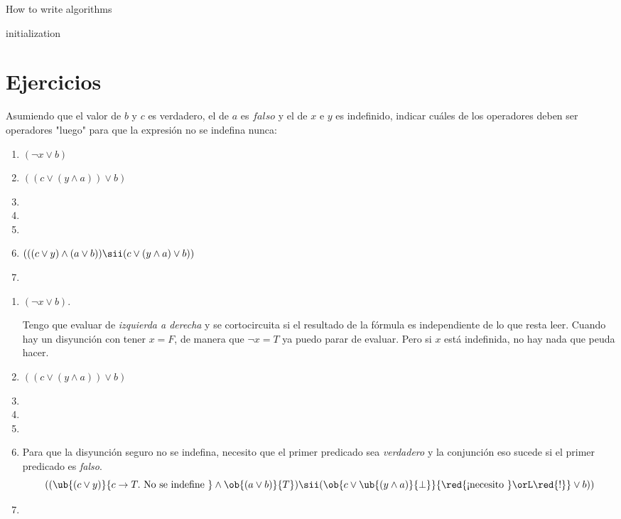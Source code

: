 



\begin{algorithm}[H] \caption{
    How to write algorithms
  }

  \BlankLine
  initialization\;
\end{algorithm}

\section*{Ejercicios}

\begin{enunciado}{\ejercicio}
  Asumiendo que el valor de $b$ y $c$ es verdadero, el de $a$ es $falso$ y el de $x$ e $y$ es indefinido, indicar cuáles de los operadores
  deben ser operadores "luego" para que la expresión no se indefina nunca:\par
  \begin{enumerate}[label=\alph*)]
    \item $(\neg x \lor b)$
    \item $((c \lor (y \land a)) \lor b)$
    \item
    \item
    \item
    \item $(((c \lor y) \land (a \lor b)) \sii (c \lor (y \land a) \lor b))$
    \item
  \end{enumerate}
\end{enunciado}

\begin{enumerate}[label=\alph*)]
  \item $(\neg x \lor b)$.\par
        Tengo que evaluar de \textit{izquierda a derecha} y se cortocircuita si el resultado de la fórmula es independiente de lo que resta leer.
        Cuando hay un disyunción con tener $x = F$, de manera que $\neg x = T$ ya puedo parar de evaluar. Pero si $x$ está indefinida, no hay nada que
        peuda hacer.

  \item $((c \lor (y \land a)) \lor b)$
  \item
  \item
  \item
  \item
        Para que la disyunción seguro no se indefina, necesito que el primer predicado sea \textit{verdadero} y la conjunción eso sucede si el primer predicado
        es \textit{falso}.
        $$
          ((\ub{(c \lor y)}{c \to T.\text{ No se indefine }} \land \ob{(a \lor b)}{T}) \sii (\ob{c \lor \ub{(y \land a)}{\perp}}{\text{\red{¡necesito }}\orL \red{!}} \lor b))
        $$
  \item
\end{enumerate}


